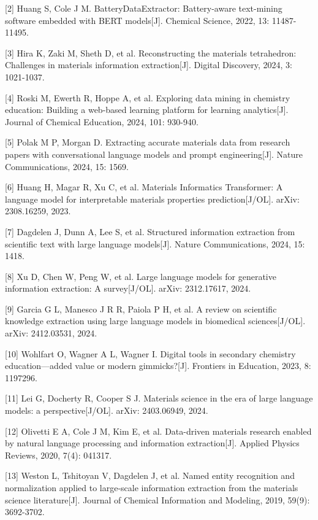 {[}2{]} Huang S, Cole J M. BatteryDataExtractor: Battery-aware text-mining software embedded with BERT models{[}J{]}. Chemical Science, 2022, 13: 11487-11495.

{[}3{]} Hira K, Zaki M, Sheth D, et al. Reconstructing the materials tetrahedron: Challenges in materials information extraction{[}J{]}. Digital Discovery, 2024, 3: 1021-1037.

{[}4{]} Roski M, Ewerth R, Hoppe A, et al. Exploring data mining in chemistry education: Building a web-based learning platform for learning analytics{[}J{]}. Journal of Chemical Education, 2024, 101: 930-940.

{[}5{]} Polak M P, Morgan D. Extracting accurate materials data from research papers with conversational language models and prompt engineering{[}J{]}. Nature Communications, 2024, 15: 1569.

{[}6{]} Huang H, Magar R, Xu C, et al. Materials Informatics Transformer: A language model for interpretable materials properties prediction{[}J/OL{]}. arXiv: 2308.16259, 2023.

{[}7{]} Dagdelen J, Dunn A, Lee S, et al. Structured information extraction from scientific text with large language models{[}J{]}. Nature Communications, 2024, 15: 1418.

{[}8{]} Xu D, Chen W, Peng W, et al. Large language models for generative information extraction: A survey{[}J/OL{]}. arXiv: 2312.17617, 2024.

{[}9{]} Garcia G L, Manesco J R R, Paiola P H, et al. A review on scientific knowledge extraction using large language models in biomedical sciences{[}J/OL{]}. arXiv: 2412.03531, 2024.

{[}10{]} Wohlfart O, Wagner A L, Wagner I. Digital tools in secondary chemistry education---added value or modern gimmicks?{[}J{]}. Frontiers in Education, 2023, 8: 1197296.

{[}11{]} Lei G, Docherty R, Cooper S J. Materials science in the era of large language models: a perspective{[}J/OL{]}. arXiv: 2403.06949, 2024.

{[}12{]} Olivetti E A, Cole J M, Kim E, et al. Data-driven materials research enabled by natural language processing and information extraction{[}J{]}. Applied Physics Reviews, 2020, 7(4): 041317.

{[}13{]} Weston L, Tshitoyan V, Dagdelen J, et al. Named entity recognition and normalization applied to large-scale information extraction from the materials science literature{[}J{]}. Journal of Chemical Information and Modeling, 2019, 59(9): 3692-3702.

